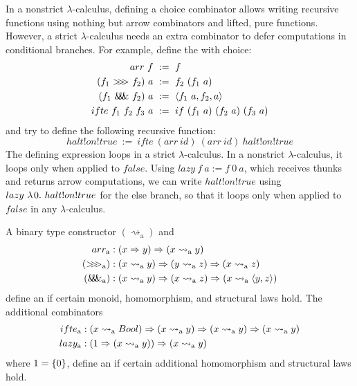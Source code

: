 \documentclass{llncs}
\newcommand{\arrow}{\rightsquigarrow}
\newcommand{\arrowarr}{\ensuremath{arr}}
\newcommand{\arrowcomp}{\ensuremath{{>}\mspace{-6mu}{>}\mspace{-6mu}{>}}}
\newcommand{\arrowpair}{\ensuremath{\mathit{\&\mspace{-7.5mu}\&\mspace{-7.5mu}\&}}}
\newcommand{\arrowif}{\ensuremath{ifte}}
\newcommand{\arrowlazy}{\ensuremath{lazy}}
\newcommand{\gen}{_\mathrm{a}}
\begin{document}
In a nonstrict $\lambda$-calculus, defining a choice combinator allows writing recursive functions using nothing but arrow combinators and lifted, pure functions.
However, a strict $\lambda$-calculus needs an extra combinator to defer computations in conditional branches.
For example, define the  with choice:
\begin{equation}
\begin{aligned}
	\arrowarr~f &\ := \ f \\
	(f_1~\arrowcomp~f_2)~a &\ := \ f_2~(f_1~a) \\
	(f_1~\arrowpair~f_2)~a &\ := \ \pair{f_1~a,f_2,a} \\
	\arrowif~f_1~f_2~f_3~a &\ := \ if~(f_1~a)~(f_2~a)~(f_3~a) \\
\end{aligned}
\label{eqn:function-arrow}
\end{equation}
and try to define the following recursive function:
\begin{equation}
	halt!on!true \ := \ \arrowif~(\arrowarr~id)~(\arrowarr~id)~halt!on!true
\end{equation}
The defining expression loops in a strict $\lambda$-calculus.
In a nonstrict $\lambda$-calculus, it loops only when applied to $false$.
Using $\arrowlazy~f~a := f~0~a$, which receives thunks and returns arrow computations, we can write $halt!on!true$ using $\arrowlazy~\fun{0}{halt!on!true}$ for the else branch, so that it loops only when applied to $false$ in any $\lambda$-calculus.

\begin{definition}A binary type constructor $(\arrow\gen)$ and
\begin{equation}
\begin{aligned}
	\arrowarr\gen &: (x \tto y) \tto (x \arrow\gen y)
\\
	(\arrowcomp\gen) &: (x \arrow\gen y) \tto (y \arrow\gen z) \tto (x \arrow\gen z)
\\
	(\arrowpair\gen) &: (x \arrow\gen y) \tto (x \arrow\gen z) \tto (x \arrow\gen \pair{y,z})
\end{aligned}
\label{eqn:arrow-combinators}
\end{equation}
define an  if certain monoid, homomorphism, and structural laws hold.
The additional combinators
\begin{equation}
\begin{aligned}
	\arrowif\gen &: (x \arrow\gen Bool) \tto (x \arrow\gen y) \tto (x \arrow\gen y) \tto (x \arrow\gen y)
\\
	\arrowlazy\gen &: (1 \tto (x \arrow\gen y)) \tto (x \arrow\gen y)
\end{aligned}
\end{equation}
where $1 = \{{0}\}$, define an  if certain additional homomorphism and structural laws hold.
\end{definition}
\end{document}
